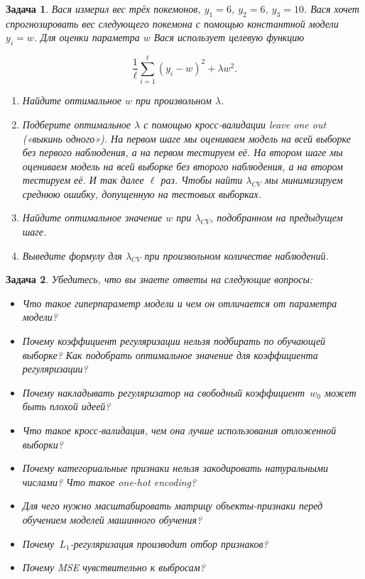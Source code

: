\documentclass[12pt,fleqn]{article}
\newtheorem{esProblem}{Задача}
\begin{document}
\begin{esProblem}
Вася измерил вес трёх покемонов,  $y_1=6$, $y_2=6$, $y_3=10$.  Вася хочет спрогнозировать вес следующего покемона с помощью константной модели $y_i = w$. Для оценки параметра $w$ Вася использует целевую функцию

\begin{equation*} 
    \frac{1}{\ell}\sum_{i=1}^{\ell} (y_i - w)^2 + \lambda w^2.
\end{equation*} 

\begin{enumerate}
    \item Найдите оптимальное $w$ при произвольном $\lambda$. 
    \item Подберите оптимальное $\lambda$ с помощью кросс-валидации leave one out («выкинь одного»). На первом шаге мы оцениваем модель на всей выборке без первого наблюдения, а на первом тестируем её. На втором шаге мы оцениваем модель на всей выборке без второго наблюдения, а на втором тестируем её. И так далее $\ell$ раз. Чтобы найти $\lambda_{CV}$ мы минимизируем среднюю ошибку, допущенную на тестовых выборках.
	\item Найдите оптимальное значение $w$ при $\lambda_{CV}$, подобранном на предыдущем шаге. 
    \item Выведите формулу для $\lambda_{CV}$ при произвольном количестве наблюдений.
\end{enumerate}
\end{esProblem}

\begin{esProblem}
    Убедитесь, что вы знаете ответы на следующие вопросы:
    \begin{itemize}
        \item Что такое гиперпараметр модели и чем он отличается от параметра модели?
        \item Почему коэффициент регуляризации нельзя подбирать по обучающей выборке? Как подобрать оптимальное значение для коэффициента регуляризации? 
        \item Почему накладывать регуляризатор на свободный коэффициент~$w_0$ может быть плохой идеей?
        \item Что такое кросс-валидация, чем она лучше использования отложенной выборки?
        \item Почему категориальные признаки нельзя закодировать натуральными числами? Что такое one-hot encoding?
        \item Для чего нужно масштабировать матрицу объекты-признаки перед обучением моделей машинного обучения?
        \item Почему~$L_1$-регуляризация производит отбор признаков?
        \item Почему MSE чувствительно к выбросам? 
    \end{itemize}
\end{esProblem}
\end{document}
